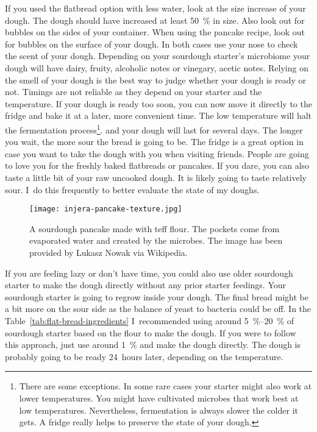 If you used the flatbread option with less water, look at the size increase
of your dough. The dough should have increased at least \qty{50}{\percent} in size.
Also look out for bubbles on the sides of your container.
When using the pancake recipe, look out for bubbles on the surface of your dough.
In both cases use your nose to check the scent of your dough. Depending
on your sourdough starter's microbiome your dough will have
dairy, fruity, alcoholic notes or vinegary, acetic notes. Relying
on the smell of your dough is the best way to judge whether your
dough is ready or not. Timings are not reliable as they
depend on your starter and the temperature. If your dough
is ready too soon, you can now move it directly to the fridge and bake
it at a later, more convenient time. The low temperature will halt the fermentation
process\footnote{There are some exceptions. In some rare cases your starter
might also work at lower temperatures. You might have cultivated microbes that work best at
low temperatures. Nevertheless, fermentation
is always slower the colder it gets. A fridge really helps to preserve the state
of your dough.}.
and your dough will last for several days. The longer you wait, the more sour the
bread is going to be. The fridge is a great option in case you want to
take the dough with you when visiting friends. People are going
to love you for the freshly baked flatbreads or pancakes. If you dare,
you can also taste a little bit of your raw uncooked dough. It is likely
going to taste relatively sour. I~do this frequently to better evaluate the
state of my doughs.

\begin{figure}[htb!]
\begin{center}
  \texttt{[image: injera-pancake-texture.jpg]}
  \caption[Teff sourdough pancake]{A sourdough pancake made with teff flour.
      The pockets come from evaporated water and  created by the
      microbes.  The image has been provided by Lukasz Nowak via Wikipedia.}
\end{center}
\end{figure}

If you are feeling lazy or don't have time, you could also use older sourdough starter
to make the dough directly without any prior starter feedings. Your sourdough starter
is going to regrow inside your dough. The
final bread might be a bit more on the sour side as the balance of yeast to
bacteria could be off. In the Table~\ref{tab:flat-bread-ingredients}
I~recommended using around \qtyrange{5}{20}{\percent}
of sourdough starter based on the flour to make the dough. If you were to follow
this approach, just use around \qty{1}{\percent} and make the dough directly.
The dough is probably going to be ready 24~hours later, depending on the temperature.

